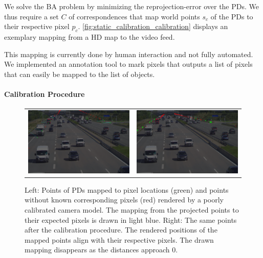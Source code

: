 We solve the BA problem by minimizing the reprojection-error over the PDs.
We thus require a set $C$ of correspondences that map world points $s_c$ of the PDs to their respective pixel $p_c$. 
\autoref{fig:static_calibration_calibration} displays an exemplary mapping from a HD map to the video feed.

This mapping is currently done by human interaction and not fully automated. 
We implemented an annotation tool to mark pixels that outputs a list of pixels that can easily be mapped to the list of objects.


\paragraph{Calibration Procedure}
\begin{figure}[!ht]
  \centering
  \begin{tabular}{cc}
    \includegraphics[width=0.4\linewidth]{images/calibration/background_uncalibrated_with_mapping.png}    &  
    \includegraphics[width=0.4\linewidth]{images/calibration/background_calibrated.png}    
  \end{tabular}
  \caption{
    Left: Points of PDs mapped to pixel locations (green) and points without known corresponding pixels (red) rendered by a poorly calibrated camera model.
    The mapping from the projected points to their expected pixels is drawn in light blue.
    Right: The same points after the calibration procedure.
    The rendered positions of the mapped points align with their respective pixels.
    The drawn mapping disappears as the distances approach $0$.
   }
  \label{fig:static_calibration_calibration}
\end{figure}
  
